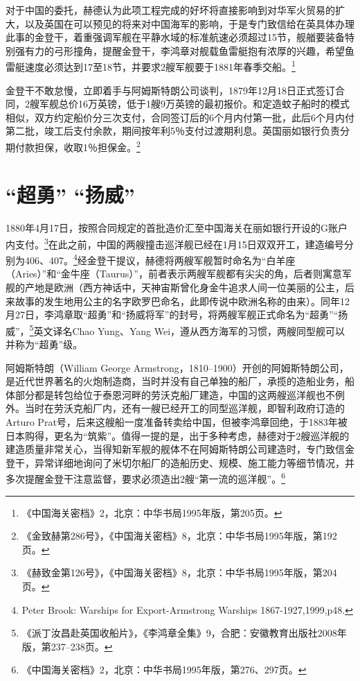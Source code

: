 \documentclass[12pt,UTF8]{ctexbook}
\begin{document}
对于中国的委托，赫德认为此项工程完成的好坏将直接影响到对华军火贸易的扩大，以及英国在可以预见的将来对中国海军的影响，于是专门致信给在英具体办理此事的金登干，着重强调军舰在平静水域的标准航速必须超过15节，舰艏要装备特别强有力的弓形撞角，提醒金登干，李鸿章对舰载鱼雷艇抱有浓厚的兴趣，希望鱼雷艇速度必须达到17至18节，并要求2艘军舰要于1881年春季交船。\footnote{《中国海关密档》2，北京：中华书局1995年版，第205页。}

金登干不敢怠慢，立即着手与阿姆斯特朗公司谈判，1879年12月18日正式签订合同，2艘军舰总价16万英镑，低于1艘9万英镑的最初报价。和定造蚊子船时的模式相似，双方约定船价分三次支付，合同签订后的6个月内付第一批，此后6个月内付第二批，竣工后支付余款，期间按年利5％支付过渡期利息。英国丽如银行负责分期付款担保，收取1％担保金。\footnote{《金致赫第286号》，《中国海关密档》8，北京：中华书局1995年版，第192页。}

\section{“超勇” “扬威”}

1880年4月17日，按照合同规定的首批造价汇至中国海关在丽如银行开设的G账户内支付。\footnote{《赫致金第126号》，《中国海关密档》8，北京：中华书局1995年版，第204页。}在此之前，中国的两艘撞击巡洋舰已经在1月15日双双开工，建造编号分别为406、407。\footnote{Peter Brook: Warships for Export-Armstrong Warships 1867-1927,1999,p48.}经金登干提议，赫德将两艘军舰暂时命名为“白羊座（Aries）”和“金牛座（Taurus）”，前者表示两艘军舰都有尖尖的角，后者则寓意军舰的产地是欧洲（西方神话中，天神宙斯曾化身金牛追求人间一位美丽的公主，后来故事的发生地用公主的名字欧罗巴命名，此即传说中欧洲名称的由来）。同年12月27日，李鸿章取“超勇”和“扬威将军”的封号，将两艘军舰正式命名为“超勇”“扬威”，\footnote{《派丁汝昌赴英国收船片》，《李鸿章全集》9，合肥：安徽教育出版社2008年版，第237--238页。}英文译名Chao Yung、Yang Wei，遵从西方海军的习惯，两艘同型舰可以并称为“超勇”级。

阿姆斯特朗（William George Armstrong，1810--1900）开创的阿姆斯特朗公司，是近代世界著名的火炮制造商，当时并没有自己单独的船厂，承揽的造船业务，船体部分都是转包给位于泰恩河畔的劳沃克船厂建造，中国的这两艘巡洋舰也不例外。当时在劳沃克船厂内，还有一艘已经开工的同型巡洋舰，即智利政府订造的Arturo Prat号，后来这艘船一度准备转卖给中国，但被李鸿章回绝，于1883年被日本购得，更名为“筑紫”。值得一提的是，出于多种考虑，赫德对于2艘巡洋舰的建造质量非常关心，当得知新军舰的舰体不在阿姆斯特朗公司建造时，专门致信金登干，异常详细地询问了米切尔船厂的造船历史、规模、施工能力等细节情况，并多次提醒金登干注意监督，要求必须造出2艘“第一流的巡洋舰”。\footnote{《中国海关密档》2，北京：中华书局1995年版，第276、297页。}
\end{document}

